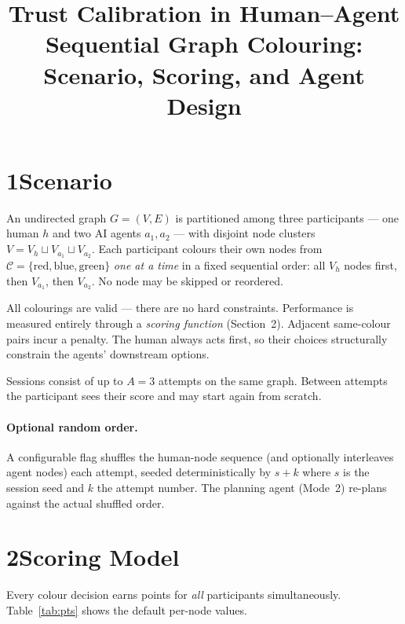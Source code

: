 \documentclass[9pt,twocolumn]{article}
\title{\vspace{-1.5em}\large\bfseries
  Trust Calibration in Human--Agent Sequential Graph Colouring:\\[-2pt]
  Scenario, Scoring, and Agent Design
\vspace{-1em}}
\author{}
\date{}
\begin{document}
\maketitle
\thispagestyle{empty}

\section*{1\quad Scenario}

An undirected graph $G=(V,E)$ is partitioned among three participants --- one human $h$
and two AI agents $a_1, a_2$ --- with disjoint node clusters
$V = V_h \sqcup V_{a_1} \sqcup V_{a_2}$.
Each participant colours their own nodes from $\mathcal{C} = \{\text{red},\text{blue},\text{green}\}$
\emph{one at a time} in a fixed sequential order: all $V_h$ nodes first, then $V_{a_1}$,
then $V_{a_2}$.  No node may be skipped or reordered.

All colourings are valid --- there are no hard constraints.  Performance is measured
entirely through a \emph{scoring function} (Section~2).  Adjacent same-colour pairs
incur a penalty.  The human always acts first, so their choices structurally constrain
the agents' downstream options.

Sessions consist of up to $A=3$ attempts on the same graph.  Between attempts the
participant sees their score and may start again from scratch.

\paragraph{Optional random order.}
A configurable flag shuffles the human-node sequence (and optionally interleaves agent
nodes) each attempt, seeded deterministically by $s + k$ where $s$ is the session seed
and $k$ the attempt number.  The planning agent (Mode~2) re-plans against the actual
shuffled order.

\section*{2\quad Scoring Model}

Every colour decision earns points for \emph{all} participants simultaneously.
Table~\ref{tab:pts} shows the default per-node values.
\end{document}
